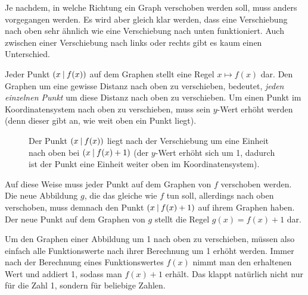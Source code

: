 \documentclass[../../main.tex]{subfiles}
\begin{document}
Je nachdem, in welche Richtung ein Graph verschoben werden soll, muss anders vorgegangen werden. Es wird aber gleich klar werden, dass eine Verschiebung nach oben sehr ähnlich wie eine Verschiebung nach unten funktioniert. Auch zwischen einer Verschiebung nach links oder rechts gibt es kaum einen Unterschied.

Jeder Punkt $\left(x \:\middle|\: f(x)\right)$ auf dem Graphen stellt eine Regel $x\mapsto f(x)$ dar. Den Graphen um eine gewisse Distanz nach oben zu verschieben, bedeutet, \emph{jeden einzelnen Punkt} um diese Distanz nach oben zu verschieben. Um einen Punkt im Koordinatensystem nach oben zu verschieben, muss sein $y$-Wert erhöht werden (denn dieser gibt an, wie weit oben ein Punkt liegt).

\begin{figure}[ht]
    \centering
    \caption{Der Punkt $\left(x \:\middle|\: f(x)\right)$ liegt nach der Verschiebung um eine Einheit nach oben bei $\left(x \:\middle|\: f(x)+1\right)$ (der $y$-Wert erhöht sich um 1, dadurch ist der Punkt eine Einheit weiter oben im Koordinatensystem).}
\end{figure}

Auf diese Weise muss jeder Punkt auf dem Graphen von $f$ verschoben werden. Die neue Abbildung $g$, die das gleiche wie $f$ tun soll, allerdings nach oben verschoben, muss demnach den Punkt $\left(x \:\middle|\: f(x)+1\right)$ auf ihrem Graphen haben. Der neue Punkt auf dem Graphen von $g$ stellt die Regel $g(x)=f(x)+1$ dar.

Um den Graphen einer Abbildung um 1 nach oben zu verschieben, müssen also einfach alle Funktionswerte nach ihrer Berechnung um 1 erhöht werden. Immer nach der Berechnung eines Funktionswertes $f(x)$ nimmt man den erhaltenen Wert und addiert 1, sodass man $f(x)+1$ erhält. Das klappt natürlich nicht nur für die Zahl 1, sondern für beliebige Zahlen.
\end{document}
